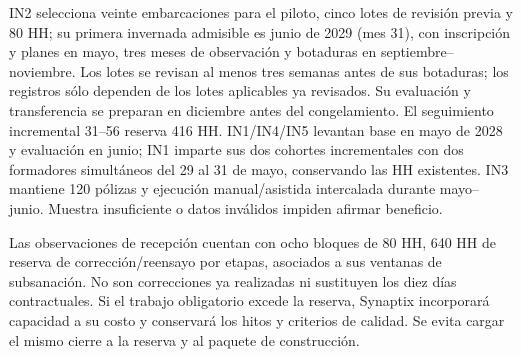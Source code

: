 IN2 selecciona veinte embarcaciones para el piloto, cinco lotes de revisión previa y 80 HH; su primera invernada admisible es junio de 2029 (mes 31), con inscripción y planes en mayo, tres meses de observación y botaduras en septiembre--noviembre. Los lotes se revisan al menos tres semanas antes de sus botaduras; los registros sólo dependen de los lotes aplicables ya revisados. Su evaluación y transferencia se preparan en diciembre antes del congelamiento. El seguimiento incremental 31--56 reserva 416 HH. IN1/IN4/IN5 levantan base en mayo de 2028 y evaluación en junio; IN1 imparte sus dos cohortes incrementales con dos formadores simultáneos del 29 al 31 de mayo, conservando las HH existentes. IN3 mantiene 120 pólizas y ejecución manual/asistida intercalada durante mayo--junio. Muestra insuficiente o datos inválidos impiden afirmar beneficio.

Las observaciones de recepción cuentan con ocho bloques de 80 HH, 640 HH de reserva de corrección/reensayo por etapas, asociados a sus ventanas de subsanación. No son correcciones ya realizadas ni sustituyen los diez días contractuales. Si el trabajo obligatorio excede la reserva, Synaptix incorporará capacidad a su costo y conservará los hitos y criterios de calidad. Se evita cargar el mismo cierre a la reserva y al paquete de construcción.

